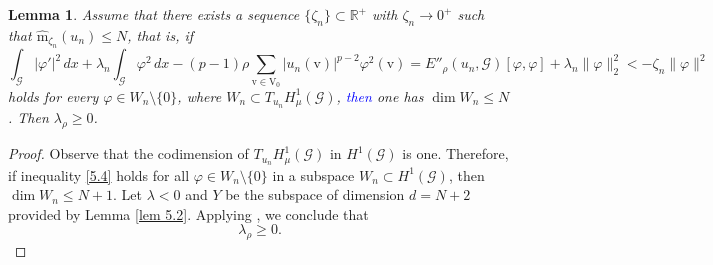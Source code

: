 \documentclass[11pt]{amsart}
\newtheorem{lemma}[theorem]{Lemma}
\newcommand{\blue}[1]{\textcolor{blue}{#1}}
\newcommand{\G}{\mathcal{G}}
\newcommand{\V}{\mathrm{V}}
\newcommand{\vv}{\mathrm{v}}
\numberwithin{equation}{section}
\begin{document}
\begin{lemma}\label{lamuna+}
Assume that there exists a sequence $\{\zeta_n\} \subset \mathbb{R}^+$ with $\zeta_n \to 0^+$ such that  $ \hat{\mathrm{m}}_{\zeta_n}(u_n) \leq N $, that is, if
\begin{equation}\label{5.4}
\int_\mathcal{G} |\varphi'|^2 \,dx+ \lambda_n\int_\mathcal{G} \varphi^2  \,dx-(p-1)\rho\sum _{\vv\in \V_0}|u_n(\vv)|^{p-2}\varphi^{2}(\vv)= E''_\rho(u_n, \mathcal{G})[\varphi, \varphi] + \lambda_n \|\varphi\|_2^2 < -\zeta_n \|\varphi\|^2 
\end{equation}
 holds for every \(\varphi\in W_n\setminus\{0\}\), where \(W_n\subset T_{u_n}H^1_\mu(\mathcal{G})\), \blue{then } one has \(\dim W_n\leq N\). Then $\lambda_\rho\geq0$.
\end{lemma}
\begin{proof}
    Observe that the codimension of $T_{u_{n}}H^{1}_{\mu}({\G})$ in $H^{1}({\G})$ is one. Therefore, if inequality \eqref{5.4} holds for all $\varphi\in W_{n}\setminus\{0\}$ in a subspace $W_{n}\subset H^{1}({\G})$, then  \(\dim W_n \leq  N+1 \). Let $\lambda<0$ and $Y$ be the subspace of dimension $d=N+2$ provided by Lemma \ref{lem 5.2}. Applying \cite[Lemma 2.7]{Ca}, we conclude that
\begin{equation}\label{5.10}
\lambda_{\rho}\geq 0.
\end{equation}
\end{proof}
\end{document}
